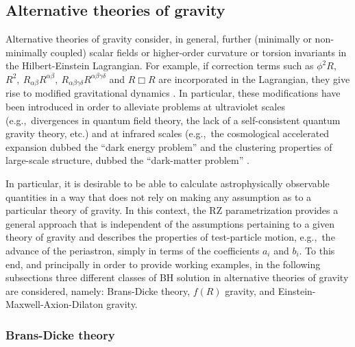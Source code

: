 \documentclass[a4paper,aps,twocolumn,showpacs,showkeys,nofootinbib,preprintnumbers,superscriptaddress,amsmath,amssymb,amsfonts]{revtex4-1}
\newcommand{\eg}{{e.g.,}~}
\begin{document}
\subsection{Alternative theories of gravity}
\label{tre.due}

Alternative theories of gravity consider, in general, further (minimally
or non-minimally coupled) scalar fields or higher-order curvature or
torsion invariants in the Hilbert-Einstein Lagrangian. For example, if
correction terms such as
$\phi^2 R$, $R^2, \ R_{\alpha\beta}R^{\alpha\beta},
\ R_{\alpha\beta\gamma\delta}R^{\alpha\beta\gamma\delta}$ 
and $R\Box R$ are incorporated in
the Lagrangian, they give rise to modified gravitational dynamics
\cite{Capozziello2011,Nojiri2011,Cai2016}.
In particular, these modifications have been introduced in order to alleviate problems at ultraviolet scales (\eg divergences in quantum field theory, the lack of
a self-consistent quantum gravity theory, etc.) and at infrared scales
(\eg the cosmological accelerated expansion dubbed the ``{dark energy
  problem}'' and the clustering properties of large-scale structure, dubbed
the ``{dark-matter problem}'' \cite{Capozziello2012}. 

In particular, it is desirable to be able to calculate astrophysically
observable quantities in a way that does not rely on making any
assumption as to a particular theory of gravity. In this context, the RZ
parametrization provides a general approach that is
independent of the assumptions pertaining to a given theory of gravity
and describes the properties of test-particle motion, \eg the advance of
the periastron, simply in terms of the coefficients $a_{i}$ and $b_{i}$.
To this end, and principally in order to provide working examples, in the
following subsections three different classes of BH
solution in alternative theories of gravity are considered, namely: Brans-Dicke
theory, $f(R)$ gravity, and Einstein-Maxwell-Axion-Dilaton gravity.

\subsubsection{Brans-Dicke theory}
\label{tre.due.uno}
\end{document}
